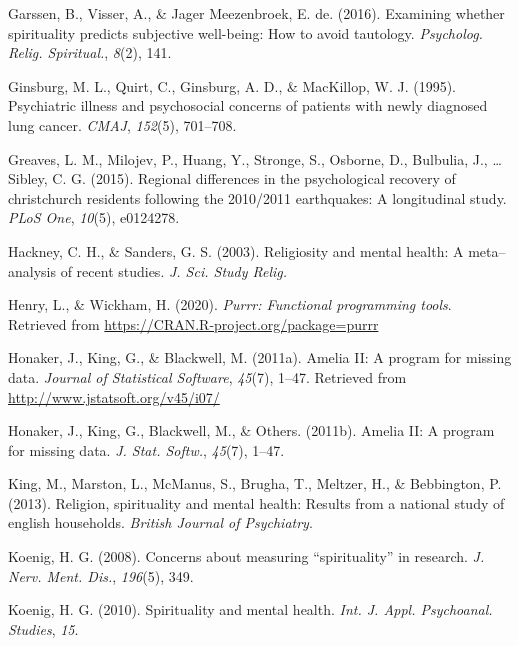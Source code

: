 \documentclass[
  english,
  man,floatsintext]{apa6}
\begin{document}
\leavevmode\hypertarget{ref-Garssen2016-kb}{}%
Garssen, B., Visser, A., \& Jager Meezenbroek, E. de. (2016). Examining whether spirituality predicts subjective well-being: How to avoid tautology. \emph{Psycholog. Relig. Spiritual.}, \emph{8}(2), 141.

\leavevmode\hypertarget{ref-Ginsburg1995-jr}{}%
Ginsburg, M. L., Quirt, C., Ginsburg, A. D., \& MacKillop, W. J. (1995). Psychiatric illness and psychosocial concerns of patients with newly diagnosed lung cancer. \emph{CMAJ}, \emph{152}(5), 701--708.

\leavevmode\hypertarget{ref-greaves2015regional}{}%
Greaves, L. M., Milojev, P., Huang, Y., Stronge, S., Osborne, D., Bulbulia, J., \ldots{} Sibley, C. G. (2015). Regional differences in the psychological recovery of christchurch residents following the 2010/2011 earthquakes: A longitudinal study. \emph{PLoS One}, \emph{10}(5), e0124278.

\leavevmode\hypertarget{ref-Hackney2003-rs}{}%
Hackney, C. H., \& Sanders, G. S. (2003). Religiosity and mental health: A meta--analysis of recent studies. \emph{J. Sci. Study Relig.}

\leavevmode\hypertarget{ref-R-purrr}{}%
Henry, L., \& Wickham, H. (2020). \emph{Purrr: Functional programming tools}. Retrieved from \url{https://CRAN.R-project.org/package=purrr}

\leavevmode\hypertarget{ref-R-Amelia}{}%
Honaker, J., King, G., \& Blackwell, M. (2011a). Amelia II: A program for missing data. \emph{Journal of Statistical Software}, \emph{45}(7), 1--47. Retrieved from \url{http://www.jstatsoft.org/v45/i07/}

\leavevmode\hypertarget{ref-Honaker2011-yu}{}%
Honaker, J., King, G., Blackwell, M., \& Others. (2011b). Amelia II: A program for missing data. \emph{J. Stat. Softw.}, \emph{45}(7), 1--47.

\leavevmode\hypertarget{ref-King2013-cg}{}%
King, M., Marston, L., McManus, S., Brugha, T., Meltzer, H., \& Bebbington, P. (2013). Religion, spirituality and mental health: Results from a national study of english households. \emph{British Journal of Psychiatry}.

\leavevmode\hypertarget{ref-Koenig2008-lv}{}%
Koenig, H. G. (2008). Concerns about measuring ``spirituality'' in research. \emph{J. Nerv. Ment. Dis.}, \emph{196}(5), 349.

\leavevmode\hypertarget{ref-Koenig2010-gk}{}%
Koenig, H. G. (2010). Spirituality and mental health. \emph{Int. J. Appl. Psychoanal. Studies}, \emph{15}.
\end{document}
